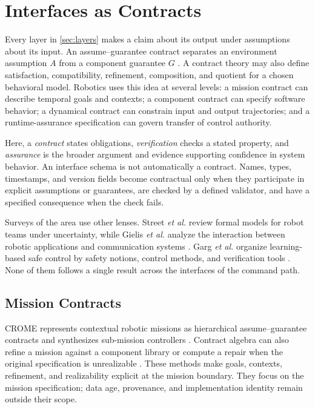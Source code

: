 \section{Interfaces as Contracts}
\label{sec:contracts}

Every layer in \cref{sec:layers} makes a claim about its output under
assumptions about its input.  An assume--guarantee contract separates an
environment assumption $A$ from a component guarantee $G$
\cite{benveniste2007contracts}.  A contract theory may also define satisfaction,
compatibility, refinement, composition, and quotient for a chosen behavioral
model.  Robotics uses this idea at several levels: a mission contract can
describe temporal goals and contexts; a component contract can specify software
behavior; a dynamical contract can constrain input and output trajectories; and
a runtime-assurance specification can govern transfer of control authority.

Here, a \emph{contract} states obligations, \emph{verification} checks a stated
property, and \emph{assurance} is the broader argument and evidence supporting
confidence in system behavior.  An interface schema is not automatically a
contract.  Names, types, timestamps, and version fields become contractual only
when they participate in explicit assumptions or guarantees, are checked by a
defined validator, and have a specified consequence when the check fails.

Surveys of the area use other lenses.  Street \emph{et al.} review formal
models for robot teams under uncertainty, while Gielis \emph{et al.} analyze the
interaction between robotic applications and communication systems
\cite{street2023formal,gielis2022communications}.  Garg \emph{et al.} organize
learning-based safe control by safety notions, control methods, and
verification tools \cite{garg2024safecontrol}.  None of them follows a single
result across the interfaces of the command path.

\subsection{Mission Contracts}

CROME represents contextual robotic missions as hierarchical assume--guarantee
contracts and synthesizes sub-mission controllers
\cite{mallozzi2020crome,mallozzi2023contextual}.  Contract algebra can also
refine a mission against a component library or compute a repair when the
original specification is unrealizable \cite{mallozzi2022repair}.  These methods
make goals, contexts, refinement, and realizability explicit at the mission
boundary.  They focus on the mission specification; data age, provenance, and
implementation identity remain outside their scope.

